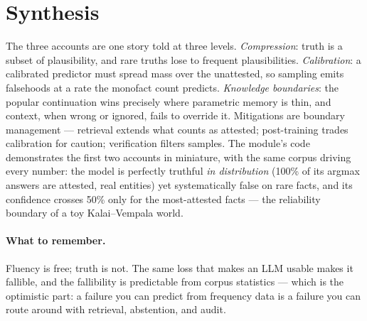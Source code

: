 \documentclass[11pt]{article}
\begin{document}
\section{Synthesis}
The three accounts are one story told at three levels. \emph{Compression}: truth is a subset of plausibility, and rare truths lose to frequent plausibilities. \emph{Calibration}: a calibrated predictor must spread mass over the unattested, so sampling emits falsehoods at a rate the monofact count predicts. \emph{Knowledge boundaries}: the popular continuation wins precisely where parametric memory is thin, and context, when wrong or ignored, fails to override it. Mitigations are boundary management --- retrieval extends what counts as attested; post-training trades calibration for caution; verification filters samples. The module's code demonstrates the first two accounts in miniature, with the same corpus driving every number: the model is perfectly truthful \emph{in distribution} (100\% of its argmax answers are attested, real entities) yet systematically false on rare facts, and its confidence crosses 50\% only for the most-attested facts --- the reliability boundary of a toy Kalai--Vempala world.

\paragraph{What to remember.} Fluency is free; truth is not. The same loss that makes an LLM usable makes it fallible, and the fallibility is predictable from corpus statistics --- which is the optimistic part: a failure you can predict from frequency data is a failure you can route around with retrieval, abstention, and audit.



\end{document}
